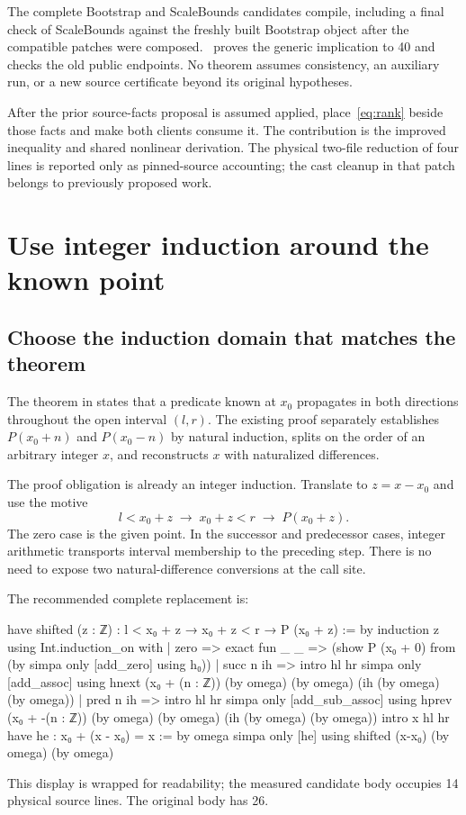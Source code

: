\documentclass[11pt,a4paper]{article}
\newcommand{\code}[1]{\texttt{\detokenize{#1}}}
\newcommand{\src}[2]{\href{https://github.com/VladimirReshetnikov/ProveIt/blob/4b3dd4efb10f1af27143a6142380322131968726/#1}{#2}}
\begin{document}
The complete Bootstrap and ScaleBounds candidates compile, including a final check of ScaleBounds against the freshly built Bootstrap object after the compatible patches were composed. \  proves the generic implication to 40 and checks the old public endpoints. No theorem assumes consistency, an auxiliary run, or a new source certificate beyond its original hypotheses.

After the prior source-facts proposal is assumed applied, place~\eqref{eq:rank} beside those facts and make both clients consume it. The contribution is the improved inequality and shared nonlinear derivation. The physical two-file reduction of four lines is reported only as pinned-source accounting; the cast cleanup in that patch belongs to previously proposed work.

\section{Use integer induction around the known point}
\label{sec:interval}

\subsection{Choose the induction domain that matches the theorem}

The theorem \code{interval_propagate} in
\src{Computability/DiophantineConsistency/Lean/DiophantineConsistency/WangTiles942ResetRows.lean}{\code{WangTiles942ResetRows.lean}} states that a predicate known at $x_0$ propagates in both directions throughout the open interval $(l,r)$. The existing proof separately establishes $P(x_0+n)$ and $P(x_0-n)$ by natural induction, splits on the order of an arbitrary integer $x$, and reconstructs $x$ with naturalized differences.

The proof obligation is already an integer induction. Translate to $z=x-x_0$ and use the motive
\[
  l<x_0+z\;\longrightarrow\;x_0+z<r\;\longrightarrow\;P(x_0+z).
\]
The zero case is the given point. In the successor and predecessor cases, integer arithmetic transports interval membership to the preceding step. There is no need to expose two natural-difference conversions at the call site.

The recommended complete replacement is:
\begin{Lean}
have shifted (z : ℤ) : l < x₀ + z → x₀ + z < r → P (x₀ + z) := by
  induction z using Int.induction_on with
  | zero => exact fun _ _ =>
      (show P (x₀ + 0) from (by simpa only [add_zero] using h₀))
  | succ n ih =>
      intro hl hr
      simpa only [add_assoc] using
        hnext (x₀ + (n : ℤ)) (by omega) (by omega)
          (ih (by omega) (by omega))
  | pred n ih =>
      intro hl hr
      simpa only [add_sub_assoc] using
        hprev (x₀ + -(n : ℤ)) (by omega) (by omega)
          (ih (by omega) (by omega))
intro x hl hr
have he : x₀ + (x - x₀) = x := by omega
simpa only [he] using shifted (x-x₀) (by omega) (by omega)
\end{Lean}
This display is wrapped for readability; the measured candidate body occupies 14 physical source lines. The original body has 26.
\end{document}
